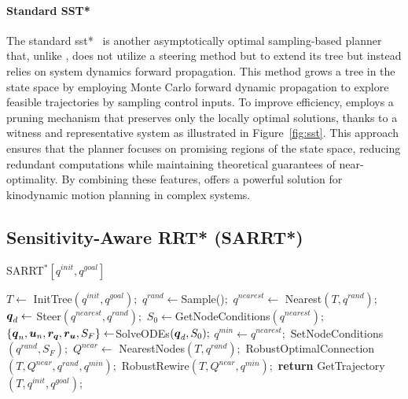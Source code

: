 \paragraph{Standard SST*}

The standard \gls{sst*}~\cite{cSST} is another asymptotically optimal sampling-based planner that, unlike , does not utilize a steering method but to extend its tree but instead relies on system dynamics forward propagation.
This method grows a tree in the state space by employing Monte Carlo forward dynamic propagation to explore feasible trajectories by sampling control inputs.
To improve efficiency,  employs a pruning mechanism that preserves only the locally optimal solutions, thanks to a witness and representative system as illustrated in Figure~\ref{fig:sst}.
This approach ensures that the planner focuses on promising regions of the state space, reducing redundant computations while maintaining theoretical guarantees of near-optimality. 
By combining these features,  offers a powerful solution for kinodynamic motion planning in complex systems.

\subsection{Sensitivity-Aware RRT* (SARRT*)}\label{sec:sarrt*}

\begin{algorithm}[h!]
    \caption{SARRT$^* [q^{init}, q^{goal}]$}\label{alg:SARRT*}
    \begin{algorithmic}[1]
        \State $T \gets$ InitTree$({q^{init}, q^{goal}});$
            \State $q^{rand} \gets $Sample()$;$
            \State $q^{nearest} \gets$ Nearest$(T,{q^{rand}});$
            \State $\boldsymbol{q}_d \gets$ Steer$({q^{nearest}},{q^{rand}});$
            \State $S_0 \gets $GetNodeConditions$({q^{nearest}});$
            \State $\left \{\boldsymbol{q}_n, \boldsymbol{u}_n, \boldsymbol{r_q}, \boldsymbol{r_u}, S_F \right \}  \gets $SolveODEs$(\boldsymbol{q}_d, S_0);$
                \State $q^{min} \gets q^{nearest};$
                \State SetNodeConditions$({q^{rand}}, S_{F});$
                \State $Q^{near} \gets$ NearestNodes$(T,{q^{rand}});$
                \State RobustOptimalConnection$(T, Q^{near}, q^{rand}, q^{min});$
                \State RobustRewire$(T, Q^{near}, q^{min});$
            \EndIf
        \EndWhile
        \State \textbf{return} GetTrajectory$(T, q^{init}, q^{goal})$;
    \end{algorithmic}
\end{algorithm}

